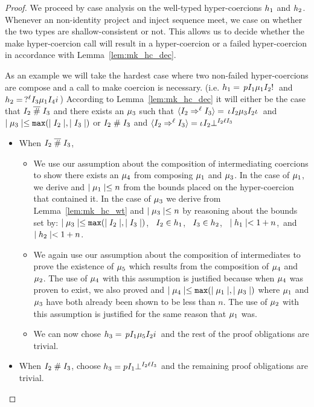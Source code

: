 \documentclass[acmtog, authorversion, acmlarge]{acmart}
\begin{document}
\begin{proof}
  We proceed by case analysis on the well-typed hyper-coercions
  $h_1$ and $h_2$. Whenever an non-identity project and
  inject sequence meet, we case on whether the two types are
  shallow-consistent or not. This allows us to decide whether
  the make hyper-coercion call will result in a hyper-coercion
  or a failed hyper-coercion in accordance with
  Lemma~\ref{lem:mk_hc_dec}.

  As an example we will take the hardest case where two non-failed
  hyper-coercions are compose and a call to make coercion is necessary.
  (i.e. $h_1 = \, p I_{1} \mu_1 I_{2}  ! \,$
  and $h_2 = \,  ?^{\ell} I_{3} \mu_1 I_{4} i \,$)
  According to Lemma~\ref{lem:mk_hc_dec} it will either be
  the case that
  $I_{2} \; \overline{\#} \; I_{3}$ and
  there exists an $\mu_3$ such that
  $\langle I_{2} \Rightarrow^{\ell} I_{3} \rangle = \, \iota_{} I_{2} \mu_3 I_{2} \iota_{} \,$
  and $\mid \mu_3 \mid \le \texttt{max}(\mid I_{2} \mid, \mid I_{3} \mid)$
  or
  $I_{2} \; \# \; I_{3}$ and
  $\langle I_{2} \Rightarrow^{\ell} I_{3} \rangle = \iota_{} I_{2} \bot^{I_2 \ell I_{3}}$
  \begin{itemize}
  \item When $I_{2} \; \overline{\#} \; I_{3}$,
      \begin{itemize}
      \item We use our assumption about the composition of
        intermediating coercions to show there exists an $\mu_4$ from
        composing $\mu_1$ and $\mu_3$.  In the case of $\mu_1$,
        we derive  and $\mid \mu_1 \mid \le n$
        from the bounds placed on the hyper-coercion that contained it.
        In the case of $\mu_3$ we derive  from
        Lemma~\ref{lem:mk_hc_wt} and $\mid \mu_3 \mid \le n$ by
        reasoning about the bounds set by:
        $\mid \mu_3 \mid \le \texttt{max}(\mid I_{2} \mid, \mid I_{3} \mid)$, \, 
        $I_2 \in h_1$, \,
        $I_3 \in h_2$, \,
        $\mid h_1 \mid < 1 + n$,\,
        and $\mid h_2 \mid < 1 + n$. 
      \item We again use our assumption about the composition
        of intermediates to prove the existence of $\mu_5$ which
        results from the composition of $\mu_4$ and $\mu_2$.
        The use of $\mu_4$ with this assumption is justified
        because when $\mu_4$ was proven to exist, we also
        proved  and
        $\mid \mu_4 \mid \le \texttt{max}( \mid \mu_1 \mid , \mid \mu_3 \mid)$ where
        $\mu_1$ and $\mu_3$ have both already been shown to be
        less than $n$. The use of $\mu_2$ with this assumption
        is justified for the same reason that $\mu_1$ was.
      \item We can now chose
        $h_3 = \, p I_1 \mu_5 I_2 i \,$ and the
        rest of the proof obligations are trivial. 
      \end{itemize}
    \item When $I_{2} \; \# \; I_{3}$, choose
      $h_3 = p I_{1} \bot^{I_2 \ell I_{3}}$ and the
      remaining proof obligations are trivial.
  \end{itemize}
\end{proof}
\end{document}
